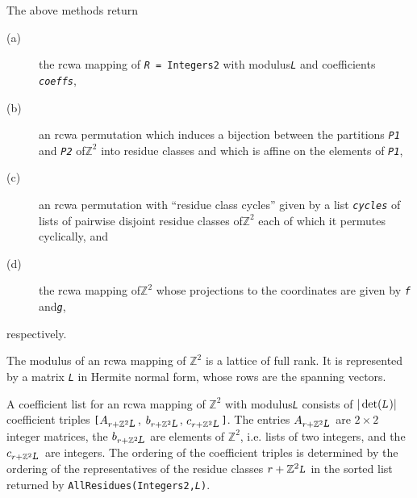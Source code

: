 \documentclass[a4paper,11pt]{report}
\begin{document}
{{{ The above methods return 
\begin{description}
\item[{(a)}]  the rcwa mapping of \texttt{\mbox{\texttt{\mdseries\slshape R}} = Integers\texttt{}2} with modulus{\nobreakspace}\mbox{\texttt{\mdseries\slshape L}} and coefficients \mbox{\texttt{\mdseries\slshape coeffs}}, 
\item[{(b)}]  an rcwa permutation which induces a bijection between the partitions \mbox{\texttt{\mdseries\slshape P1}} and \mbox{\texttt{\mdseries\slshape P2}} of{\nobreakspace}${\ensuremath{\mathbb Z}}^2$ into residue classes and which is affine on the elements of \mbox{\texttt{\mdseries\slshape P1}}, 
\item[{(c)}]  an rcwa permutation with ``residue class cycles'' given by a list \mbox{\texttt{\mdseries\slshape cycles}} of lists of pairwise disjoint residue classes of{\nobreakspace}${\ensuremath{\mathbb Z}}^2$ each of which it permutes cyclically, and 
\item[{(d)}]  the rcwa mapping of{\nobreakspace}${\ensuremath{\mathbb Z}}^2$ whose projections to the coordinates are given by \mbox{\texttt{\mdseries\slshape f}} and{\nobreakspace}\mbox{\texttt{\mdseries\slshape g}}, 
\end{description}
 respectively. 

 The modulus of an rcwa mapping of ${\ensuremath{\mathbb Z}}^2$ is a lattice of full rank. It is represented by a matrix \mbox{\texttt{\mdseries\slshape L}} in Hermite normal form, whose rows are the spanning vectors. 

 A coefficient list for an rcwa mapping of ${\ensuremath{\mathbb Z}}^2$ with modulus{\nobreakspace}\mbox{\texttt{\mdseries\slshape L}} consists of $|\det(\mbox{\texttt{\mdseries\slshape L}})|$ coefficient triples \texttt{[}$A_{r+{\ensuremath{\mathbb Z}}^2\mbox{\texttt{\mdseries\slshape L}}}$, $b_{r+{\ensuremath{\mathbb Z}}^2\mbox{\texttt{\mdseries\slshape L}}}$, $c_{r+{\ensuremath{\mathbb Z}}^2\mbox{\texttt{\mdseries\slshape L}}}$\texttt{]}. The entries $A_{r+{\ensuremath{\mathbb Z}}^2\mbox{\texttt{\mdseries\slshape L}}}$ are $2 \times 2$ integer matrices, the $b_{r+{\ensuremath{\mathbb Z}}^2\mbox{\texttt{\mdseries\slshape L}}}$ are elements of ${\ensuremath{\mathbb Z}}^2$, i.e. lists of two integers, and the $c_{r+{\ensuremath{\mathbb Z}}^2\mbox{\texttt{\mdseries\slshape L}}}$ are integers. The ordering of the coefficient triples is determined by the
ordering of the representatives of the residue classes $r+{\ensuremath{\mathbb Z}}^2\mbox{\texttt{\mdseries\slshape L}}$ in the sorted list returned by \texttt{AllResidues(Integers\texttt{}2,\mbox{\texttt{\mdseries\slshape L}})}. 

}}}
\end{document}
